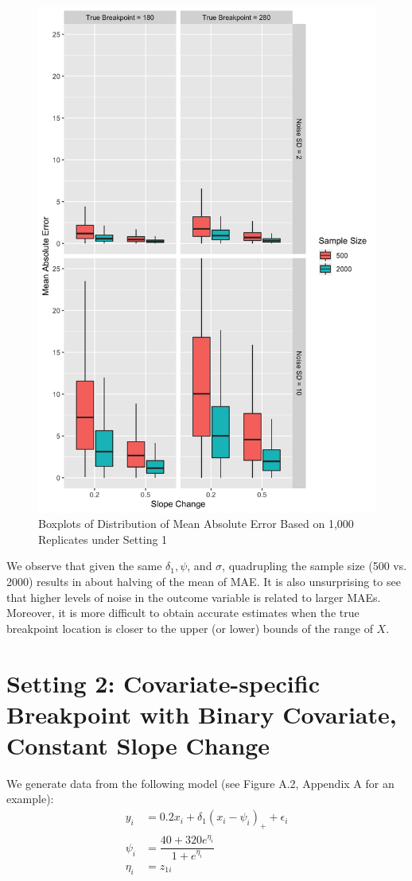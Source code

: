 \documentclass [12pt, proquest] {uwthesis}[2016/11/22]
\begin{document}
\begin{figure}
    \centering
    \includegraphics[width = 5.5 in]{Plot4_1.png}
    \caption{Boxplots of Distribution of Mean Absolute Error Based on 1,000 Replicates under Setting 1}
\end{figure}

We observe that given the same $\delta_1, \psi$, and $\sigma$, quadrupling the sample size (500 vs. 2000) results in about halving of the mean of MAE. It is also unsurprising to see that higher levels of noise in the outcome variable is related to larger MAEs. Moreover, it is more difficult to obtain accurate estimates when the true breakpoint location is closer to the upper (or lower) bounds of the range of $X$.

\section{Setting 2: Covariate-specific Breakpoint with Binary Covariate, Constant Slope Change}
We generate data from the following model (see Figure A.2, Appendix A for an example):
\begin{align*}
    y_i &= 0.2 x_i + \delta_1 (x_i - \psi_i)_+ + \epsilon_i \\
    \psi_i &= \dfrac{40 + 320 e^{\eta_i}}{1 + e^{\eta_i}} \\
    \eta_i &= z_{1i}
\end{align*}
\end{document}
